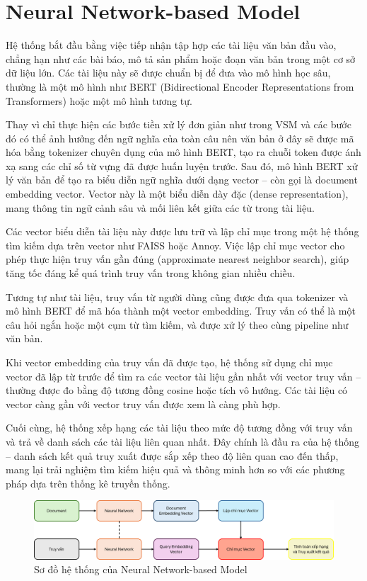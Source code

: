 \section{Neural Network-based Model}
Hệ thống bắt đầu bằng việc tiếp nhận tập hợp các tài liệu văn bản đầu vào, chẳng hạn như các bài báo, mô tả sản phẩm hoặc đoạn văn bản trong một cơ sở dữ liệu lớn. Các tài liệu này sẽ được chuẩn bị để đưa vào mô hình học sâu, thường là một mô hình như BERT (Bidirectional Encoder Representations from Transformers) hoặc một mô hình tương tự.

Thay vì chỉ thực hiện các bước tiền xử lý đơn giản như trong VSM và các bước đó có thể ảnh hưởng đến ngữ nghĩa của toàn câu nên văn bản ở đây sẽ được mã hóa bằng tokenizer chuyên dụng của mô hình BERT, tạo ra chuỗi token được ánh xạ sang các chỉ số từ vựng đã được huấn luyện trước. Sau đó, mô hình BERT xử lý văn bản để tạo ra biểu diễn ngữ nghĩa dưới dạng vector -- còn gọi là document embedding vector. Vector này là một biểu diễn dày đặc (dense representation), mang thông tin ngữ cảnh sâu và mối liên kết giữa các từ trong tài liệu.

Các vector biểu diễn tài liệu này được lưu trữ và lập chỉ mục trong một hệ thống tìm kiếm dựa trên vector như FAISS hoặc Annoy. Việc lập chỉ mục vector cho phép thực hiện truy vấn gần đúng (approximate nearest neighbor search), giúp tăng tốc đáng kể quá trình truy vấn trong không gian nhiều chiều.

Tương tự như tài liệu, truy vấn từ người dùng cũng được đưa qua tokenizer và mô hình BERT để mã hóa thành một vector embedding. Truy vấn có thể là một câu hỏi ngắn hoặc một cụm từ tìm kiếm, và được xử lý theo cùng pipeline như văn bản.

Khi vector embedding của truy vấn đã được tạo, hệ thống sử dụng chỉ mục vector đã lập từ trước để tìm ra các vector tài liệu gần nhất với vector truy vấn -- thường được đo bằng độ tương đồng cosine hoặc tích vô hướng. Các tài liệu có vector càng gần với vector truy vấn được xem là càng phù hợp.

Cuối cùng, hệ thống xếp hạng các tài liệu theo mức độ tương đồng với truy vấn và trả về danh sách các tài liệu liên quan nhất. Đây chính là đầu ra của hệ thống -- danh sách kết quả truy xuất được sắp xếp theo độ liên quan cao đến thấp, mang lại trải nghiệm tìm kiếm hiệu quả và thông minh hơn so với các phương pháp dựa trên thống kê truyền thống.

\begin{figure}[H]
    \centering
    \caption{Sơ đồ hệ thống của Neural Network-based Model}
    \includegraphics[width=\linewidth]{assets/nn-based-flowchart.png}
\end{figure}

